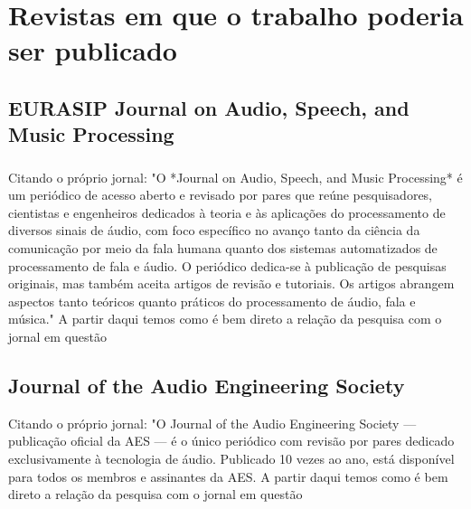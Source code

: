 \chapter{Revistas em que o trabalho poderia ser publicado}
\label{cap:conc}
\subsection*{}


\section{EURASIP Journal on Audio, Speech, and Music Processing}
\label{sec:porter}
\subsection*{}

Citando o próprio jornal: "O *Journal on Audio, Speech, and Music Processing* é um periódico de acesso aberto e revisado por pares que reúne pesquisadores, cientistas e engenheiros dedicados à teoria e às aplicações do processamento de diversos sinais de áudio, com foco específico no avanço tanto da ciência da comunicação por meio da fala humana quanto dos sistemas automatizados de processamento de fala e áudio. O periódico dedica-se à publicação de pesquisas originais, mas também aceita artigos de revisão e tutoriais. Os artigos abrangem aspectos tanto teóricos quanto práticos do processamento de áudio, fala e música."
A partir daqui temos como é bem direto a relação da pesquisa  com o jornal em questão

\section{Journal of the Audio Engineering Society}

Citando o próprio jornal: "O Journal of the Audio Engineering Society — publicação oficial da AES — é o único periódico com revisão por pares dedicado exclusivamente à tecnologia de áudio. Publicado 10 vezes ao ano, está disponível para todos os membros e assinantes da AES.
A partir daqui temos como é bem direto a relação da pesquisa  com o jornal em questão